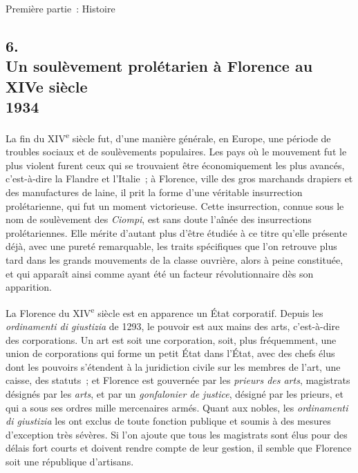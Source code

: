 \documentclass[french,twoside]{book} %
\begin{document}
\begin{center}
Première partie : Histoire\end{center}
\subsection[6. Un soulèvement prolétarien à Florence au XIVe siècle, 1934]{6. \\
Un soulèvement prolétarien à Florence au XIVe siècle \\
1934}
\noindent La fin du XIV\textsuperscript{e} siècle fut, d'une manière générale, en Europe, une période de troubles sociaux et de soulèvements populaires. Les pays où le mouvement fut le plus violent furent ceux qui se trouvaient être économiquement les plus avancés, c'est-à-dire la Flandre et l'Italie ; à Florence, ville des gros marchands drapiers et des manufactures de laine, il prit la forme d'une véritable insurrec­tion prolétarienne, qui fut un moment victorieuse. Cette insurrection, connue sous le nom de soulèvement des {\itshape Ciompi}, est sans doute l'aînée des insurrec­tions prolétariennes. Elle mérite d'autant plus d'être étudiée à ce titre qu'elle présente déjà, avec une pureté remarquable, les traits spécifiques que l'on retrouve plus tard dans les grands mouvements de la classe ouvrière, alors à peine constituée, et qui apparaît ainsi comme ayant été un facteur révolution­naire dès son apparition.\par
La Florence du XIV\textsuperscript{e} siècle est en apparence un État corporatif. Depuis les {\itshape ordinamenti di giustizia} de 1293, le pouvoir est aux mains des arts, c'est-à-dire des corporations. Un art est soit une corporation, soit, plus fréquemment, une union de corporations qui forme un petit État dans l'État, avec des chefs élus dont les pouvoirs s'étendent à la juridiction civile sur les membres de l'art, une caisse, des statuts ; et Florence est gouvernée par les {\itshape prieurs des arts}, magis­trats désignés par les {\itshape arts}, et par un {\itshape gonfalonier de justice}, désigné par les prieurs, et qui a sous ses ordres mille mercenaires armés. Quant aux nobles, les {\itshape ordinamenti di giustizia} les ont exclus de toute fonction publique et soumis à des mesures d'exception très sévères. Si l'on ajoute que tous les magistrats sont élus pour des délais fort courts et doivent rendre compte de leur gestion, il semble que Florence soit une république d'artisans.\par
\end{document}
